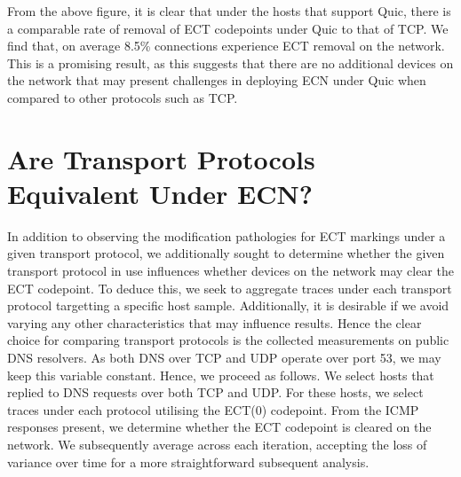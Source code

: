 \documentclass{l4proj}
\begin{document}
From the above figure, it is clear that under the hosts that support Quic, there is a comparable rate of removal of ECT codepoints under Quic to that of TCP. We find that, on average 8.5\% connections experience ECT removal on the network. This is a promising result, as this suggests that there are no additional devices on the network that may present challenges in deploying ECN under Quic when compared to other protocols such as TCP. 

\section{Are Transport Protocols Equivalent Under ECN?}

In addition to observing the modification pathologies for ECT markings under a given transport protocol, we additionally sought to determine whether the given transport protocol in use influences whether devices on the network may clear the ECT codepoint. To deduce this, we seek to aggregate traces under each transport protocol targetting a specific host sample. Additionally, it is desirable if we avoid varying any other characteristics that may influence results. Hence the clear choice for comparing transport protocols is the collected measurements on public DNS resolvers. As both DNS over TCP and UDP operate over port 53, we may keep this variable constant. Hence, we proceed as follows. We select hosts that replied to DNS requests over both TCP and UDP. For these hosts, we select traces under each protocol utilising the ECT(0) codepoint. From the ICMP responses present, we determine whether the ECT codepoint is cleared on the network. We subsequently average across each iteration, accepting the loss of variance over time for a more straightforward subsequent analysis.
\end{document}
